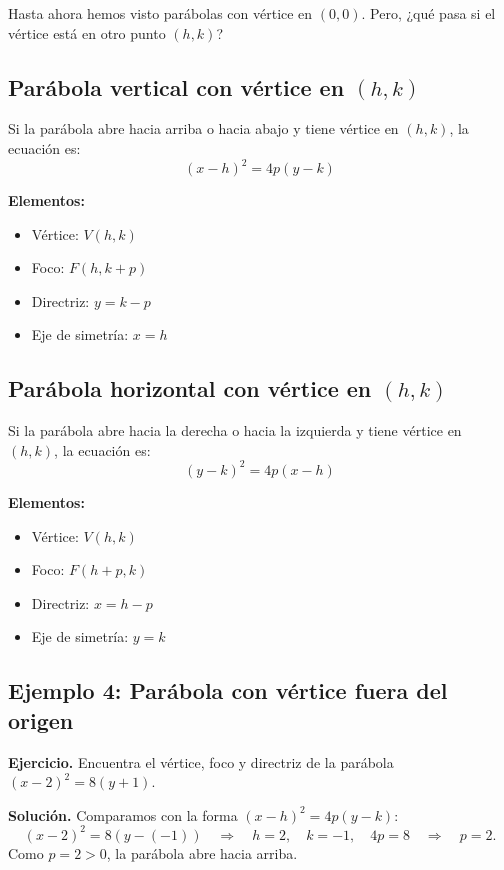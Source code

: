 \documentclass[12pt,a4paper]{article}
\begin{document}
	Hasta ahora hemos visto parábolas con vértice en \((0,0)\). Pero, ¿qué pasa si el vértice está en otro punto \((h,k)\)?

	\subsection*{Parábola vertical con vértice en \((h,k)\)}

	Si la parábola abre hacia arriba o hacia abajo y tiene vértice en \((h,k)\), la ecuación es:
	\[
	\boxed{(x-h)^2=4p(y-k)}
	\]

	\textbf{Elementos:}
	\begin{itemize}
		\item Vértice: \(V(h,k)\)
		\item Foco: \(F(h,k+p)\)
		\item Directriz: \(y=k-p\)
		\item Eje de simetría: \(x=h\)
	\end{itemize}

	\subsection*{Parábola horizontal con vértice en \((h,k)\)}

	Si la parábola abre hacia la derecha o hacia la izquierda y tiene vértice en \((h,k)\), la ecuación es:
	\[
	\boxed{(y-k)^2=4p(x-h)}
	\]

	\textbf{Elementos:}
	\begin{itemize}
		\item Vértice: \(V(h,k)\)
		\item Foco: \(F(h+p,k)\)
		\item Directriz: \(x=h-p\)
		\item Eje de simetría: \(y=k\)
	\end{itemize}

	\subsection*{Ejemplo 4: Parábola con vértice fuera del origen}

	\textbf{Ejercicio.} Encuentra el vértice, foco y directriz de la parábola \((x-2)^2=8(y+1)\).

	\bigskip

	\textbf{Solución.} Comparamos con la forma \((x-h)^2=4p(y-k)\):
	\[
	(x-2)^2=8(y-(-1)) \quad\Rightarrow\quad h=2,\quad k=-1,\quad 4p=8 \quad\Rightarrow\quad p=2.
	\]
	Como \(p=2>0\), la parábola abre hacia arriba.
\end{document}
